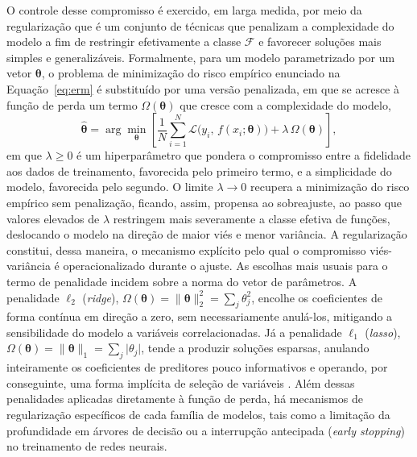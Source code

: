 O controle desse compromisso é exercido, em larga medida, por meio da
regularização que é um conjunto de técnicas que penalizam a complexidade do
modelo a fim de restringir efetivamente a classe $\mathcal{F}$ e favorecer
soluções mais simples e generalizáveis. Formalmente, para um modelo
parametrizado por um vetor $\boldsymbol{\theta}$, o problema de minimização do
risco empírico enunciado na Equação~\eqref{eq:erm} é substituído por uma versão
penalizada, em que se acresce à função de perda um termo $\Omega(\boldsymbol{\theta})$
que cresce com a complexidade do modelo,
%
\begin{equation}
    \hat{\boldsymbol{\theta}}
    = \arg\min_{\boldsymbol{\theta}}
    \left[
        \frac{1}{N}\sum_{i=1}^{N}
        \mathcal{L}\big(y_i,\, f(x_i;\boldsymbol{\theta})\big)
        + \lambda\,\Omega(\boldsymbol{\theta})
    \right],
    \label{eq:risco_regularizado}
\end{equation}
%
em que $\lambda \geq 0$ é um hiperparâmetro que pondera o compromisso entre a
fidelidade aos dados de treinamento, favorecida pelo primeiro termo, e a
simplicidade do modelo, favorecida pelo segundo. O limite $\lambda \to 0$
recupera a minimização do risco empírico sem penalização, ficando, assim, propensa ao
sobreajuste, ao passo que valores elevados de $\lambda$ restringem mais
severamente a classe efetiva de funções, deslocando o modelo na direção de maior
viés e menor variância. A regularização constitui, dessa maneira, o mecanismo explícito
pelo qual o compromisso viés-variância é operacionalizado durante o ajuste.
As escolhas mais usuais para o termo de penalidade incidem sobre a norma do
vetor de parâmetros. A penalidade $\ell_2$ (\textit{ridge}),
$\Omega(\boldsymbol{\theta}) = \lVert \boldsymbol{\theta} \rVert_2^2
= \sum_{j} \theta_j^2$, encolhe os coeficientes de forma contínua em direção a
zero, sem necessariamente anulá-los, mitigando a sensibilidade do modelo a
variáveis correlacionadas. Já a penalidade $\ell_1$ (\textit{lasso}),
$\Omega(\boldsymbol{\theta}) = \lVert \boldsymbol{\theta} \rVert_1
= \sum_{j} \lvert \theta_j \rvert$, tende a produzir soluções esparsas, anulando
inteiramente os coeficientes de preditores pouco informativos e operando, por
conseguinte, uma forma implícita de seleção de variáveis \cite{hastie2009}.
Além dessas penalidades aplicadas diretamente à função de perda, há mecanismos
de regularização específicos de cada família de modelos, tais como a limitação
da profundidade em árvores de decisão ou a interrupção antecipada
(\textit{early stopping}) no treinamento de redes neurais.

